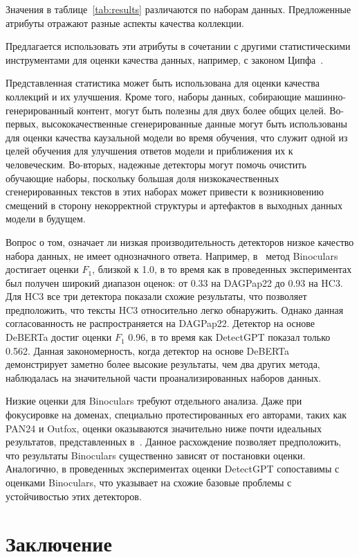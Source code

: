 Значения в таблице~\ref{tab:results} различаются по наборам данных. Предложенные атрибуты отражают разные аспекты качества коллекции.

Предлагается использовать эти атрибуты в сочетании с другими статистическими инструментами для оценки качества данных, например, с законом Ципфа~\cite{zipf}.

Представленная статистика может быть использована для оценки качества коллекций и их улучшения.
Кроме того, наборы данных, собирающие машинно-генерированный контент, могут быть полезны для двух более общих целей.
Во-первых, высококачественные сгенерированные данные могут быть использованы для оценки качества каузальной модели во время обучения, что служит одной из целей обучения для улучшения ответов модели и приближения их к человеческим.
Во-вторых, надежные детекторы могут помочь очистить обучающие наборы, поскольку большая доля низкокачественных сгенерированных текстов в этих наборах может привести к возникновению смещений в сторону некорректной структуры и артефактов в выходных данных модели в будущем.

Вопрос о том, означает ли низкая производительность детекторов низкое качество набора данных, не имеет однозначного ответа.
Например, в~\cite{hans2024spotting} метод Binoculars достигает оценки $F_1$, близкой к 1.0, в то время как в проведенных экспериментах был получен широкий диапазон оценок: от 0.33 на DAGPap22 до 0.93 на HC3.
Для HC3 все три детектора показали схожие результаты, что позволяет предположить, что тексты HC3 относительно легко обнаружить.
Однако данная согласованность не распространяется на DAGPap22.
Детектор на основе DeBERTa достиг оценки $F_1$ 0.96, в то время как DetectGPT показал только 0.562.
Данная закономерность, когда детектор на основе DeBERTa демонстрирует заметно более высокие результаты, чем два других метода, наблюдалась на значительной части проанализированных наборов данных.

Низкие оценки для Binoculars требуют отдельного анализа.
Даже при фокусировке на доменах, специально протестированных его авторами, таких как PAN24 и Outfox, оценки оказываются значительно ниже почти идеальных результатов, представленных в~\cite{hans2024spotting}.
Данное расхождение позволяет предположить, что результаты Binoculars существенно зависят от постановки оценки.
Аналогично, в проведенных экспериментах оценки DetectGPT сопоставимы с оценками Binoculars, что указывает на схожие базовые проблемы с устойчивостью этих детекторов.

\section{Заключение}

